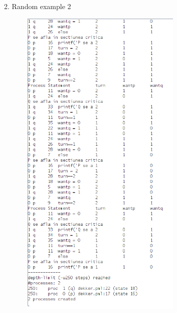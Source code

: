 \documentclass[14pt]{article}
\begin{document}
\newpage

\begin{center}
2. Random example 2
\vspace{10mm}

\includegraphics[height=6in, width = 4in]{dekker2.png}\\
\end{center}\\

\newpage
\end{document}
